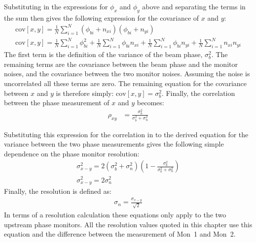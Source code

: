 Substituting in the expressions for \(\phi_{x}\) and \(\phi_{y}\) above and separating the terms in the sum then gives the following expression for the covariance of \(x\) and \(y\):
\begin{equation}
\begin{gathered}
\mathrm{cov}[x,y] = \frac{1}{N}\sum_{i=1}^{N}(\phi_{bi}+n_{xi})(\phi_{bi}+n_{yi}) \\
\mathrm{cov}[x,y] = \frac{1}{N}\sum_{i=1}^{N}\phi_{bi}^2 + \frac{1}{N}\sum_{i=1}^{N}\phi_{bi}n_{xi} + \frac{1}{N}\sum_{i=1}^{N}\phi_{bi}n_{yi} + \frac{1}{N}\sum_{i=1}^{N}n_{xi}n_{yi} 
\end{gathered}
\end{equation}
The first term is the definition of the variance of the beam phase, \(\sigma_b^2\). The remaining terms are the covariance between the beam phase and the monitor noises, and the covariance between the two monitor noises. Assuming the noise is uncorrelated all these terms are zero. The remaining equation for the covariance between \(x\) and \(y\) is therefore simply: \(\mathrm{cov}[x,y] = \sigma_b^2\). Finally, the correlation between the phase measurement of \(x\) and \(y\) becomes:
\begin{align}
\rho_{xy} &= \frac{\sigma_b^2}{\sigma_b^2 + \sigma_n^2}
\label{e:corrVsResolution}
\end{align}

Substituting this expression for the correlation in to the derived equation for the variance between the two phase measurements gives the following simple dependence on the phase monitor resolution:
\begin{equation}
\begin{gathered}
\sigma_{x-y}^2 = 2(\sigma_b^2 + \sigma_n^2)\left(1-\frac{\sigma_b^2}{\sigma_b^2 + \sigma_n^2}\right) \\
\sigma_{x-y}^2 = 2\sigma_n^2 \label{e:pffVsResolution}
\end{gathered}
\end{equation}
Finally, the resolution is defined as:
\begin{align}
\sigma_n = \frac{\sigma_{x-y}}{\sqrt{2}}
\label{e:resolutionEq}
\end{align}
In terms of a resolution calculation these equations only apply to the two upstream phase monitors. All the resolution values quoted in this chapter use this equation and the difference between the measurement of Mon~1 and Mon~2.

